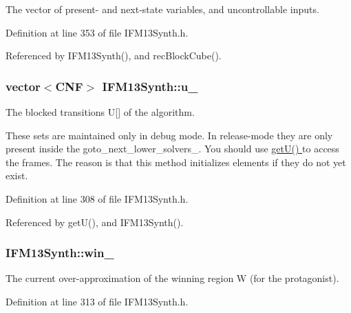 The vector of present-\/ and next-\/state variables, and uncontrollable inputs. 



Definition at line 353 of file I\-F\-M13\-Synth.\-h.



Referenced by I\-F\-M13\-Synth(), and rec\-Block\-Cube().

\hypertarget{classIFM13Synth_a493a9f0a3f2880597a89d48766706099}{
\subsubsection[{u\-\_\-}]{\setlength{\rightskip}{0pt plus 5cm}vector$<${\bf C\-N\-F}$>$ I\-F\-M13\-Synth\-::u\-\_\-\hspace{0.3cm}{\ttfamily [protected]}}}\label{classIFM13Synth_a493a9f0a3f2880597a89d48766706099}


The blocked transitions U\mbox{[}\mbox{]} of the algorithm. 

These sets are maintained only in debug mode. In release-\/mode they are only present inside the goto\-\_\-next\-\_\-lower\-\_\-solvers\-\_\-. You should use \hyperlink{classIFM13Synth_a396e520b9db59b73a46a2315ee3123b4}{get\-U() } to access the frames. The reason is that this method initializes elements if they do not yet exist. 

Definition at line 308 of file I\-F\-M13\-Synth.\-h.



Referenced by get\-U(), and I\-F\-M13\-Synth().

\hypertarget{classIFM13Synth_ab6b54169dc042466704a4e6ceee4e94d}{
\subsubsection[{win\-\_\-}]{ I\-F\-M13\-Synth\-::win\-\_\-\hspace{0.3cm}{\ttfamily [protected]}}}\label{classIFM13Synth_ab6b54169dc042466704a4e6ceee4e94d}


The current over-\/approximation of the winning region W (for the protagonist). 



Definition at line 313 of file I\-F\-M13\-Synth.\-h.



